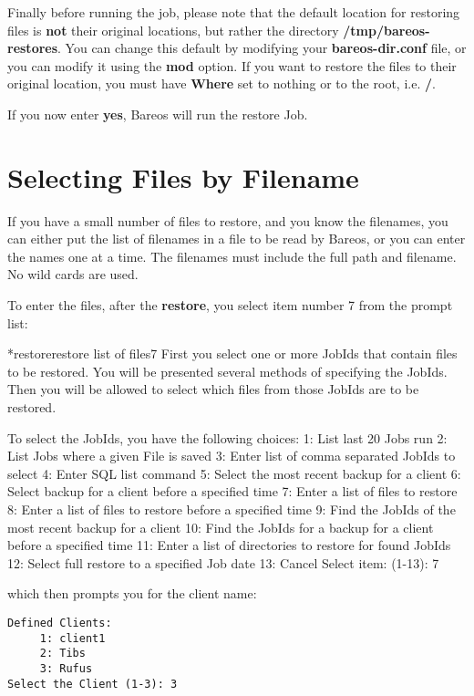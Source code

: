 Finally before running the job, please note that the default location for
restoring files is {\bf not} their original locations, but rather the directory
{\bf /tmp/bareos-restores}. You can change this default by modifying your {\bf
bareos-dir.conf} file, or you can modify it using the {\bf mod} option. If you
want to restore the files to their original location, you must have {\bf
Where} set to nothing or to the root, i.e. {\bf /}.

If you now enter {\bf yes}, Bareos will run the restore Job.


\section{Selecting Files by Filename}


If you have a small number of files to restore, and you know the filenames,
you can either put the list of filenames in a file to be read by Bareos, or
you can enter the names one at a time. The filenames must include the full
path and filename. No wild cards are used.

To enter the files, after the {\bf restore}, you select item number 7 from the
prompt list:

\begin{bconsole}{*}{restore}{restore list of files}{7}
First you select one or more JobIds that contain files
to be restored. You will be presented several methods
of specifying the JobIds. Then you will be allowed to
select which files from those JobIds are to be restored.

To select the JobIds, you have the following choices:
     1: List last 20 Jobs run
     2: List Jobs where a given File is saved
     3: Enter list of comma separated JobIds to select
     4: Enter SQL list command
     5: Select the most recent backup for a client
     6: Select backup for a client before a specified time
     7: Enter a list of files to restore
     8: Enter a list of files to restore before a specified time
     9: Find the JobIds of the most recent backup for a client
    10: Find the JobIds for a backup for a client before a specified time
    11: Enter a list of directories to restore for found JobIds
    12: Select full restore to a specified Job date
    13: Cancel
Select item:  (1-13): 7
\end{bconsole}


which then prompts you for the client name:

\footnotesize
\begin{verbatim}
Defined Clients:
     1: client1
     2: Tibs
     3: Rufus
Select the Client (1-3): 3
\end{verbatim}
\normalsize

